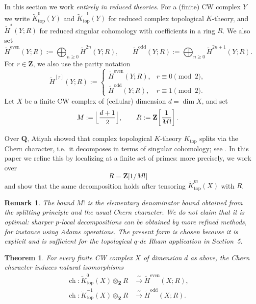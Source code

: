 \documentclass[11pt]{amsart}
\newtheorem{theorem}[lemma]{Theorem}
\newtheorem{remark}[lemma]{Remark}
\numberwithin{equation}{section}
\newcommand{\ch}{{\operatorname{ch}}}
\newcommand{\topp}{{\operatorname{top}}}
\numberwithin{equation}{section}
\newcommand{\Ktop}{K_{\operatorname{top}}}
\begin{document}
In this section we work \emph{entirely in reduced theories}. For a (finite) CW complex $Y$ we write
$\widetilde{K}_{\topp}^0(Y)$ and $\widetilde{K}_{\topp}^{-1}(Y)$ for reduced complex topological $K$-theory, and
$\widetilde H^*(Y;R)$ for reduced singular cohomology with coefficients in a ring $R$.
We also set
\[
\widetilde H^{\mathrm{even}}(Y;R):=\bigoplus_{n\ge 0}\widetilde H^{2n}(Y;R),
\qquad
\widetilde H^{\mathrm{odd}}(Y;R):=\bigoplus_{n\ge 0}\widetilde H^{2n+1}(Y;R).
\]
For $r\in\mathbf{Z}$, we also use the parity notation
\[
\widetilde H^{[r]}(Y;R):=
\begin{cases}
\widetilde H^{\mathrm{even}}(Y;R),& r\equiv 0\pmod 2,\\
\widetilde H^{\mathrm{odd}}(Y;R),& r\equiv 1\pmod 2.
\end{cases}
\]
Let $X$ be a finite CW complex of (cellular) dimension $d=\dim X$, and set
\[
M:=\Bigl\lfloor\frac{d+1}{2}\Bigr\rfloor,
\qquad
R:=\mathbf{Z}\!\left[\frac{1}{M!}\right].
\]

Over $\mathbf{Q}$, Atiyah showed that complex topological $K$-theory $\Ktop$ splits via the Chern character, i.e.\ it decomposes in terms of singular cohomology; see \cite{A62}.
In this paper we refine this by localizing at a finite set of primes: more precisely, we work over
\[
R=\mathbf{Z}\bigl[1/M!\bigr]
\]
and show that the same decomposition holds after tensoring $\widetilde{K}_{\topp}^m(X)$ with $R$.

\begin{remark}
The bound $M!$ is the elementary denominator bound obtained from the splitting
principle and the usual Chern character.  We do not claim that it is optimal:
sharper $p$-local decompositions can be obtained by more refined methods, for
instance using Adams operations.  The present form is chosen because it is
explicit and is sufficient for the topological $q$-de Rham application in
Section~5.
\end{remark}

\begin{theorem}\label{ktopchdec}
For every finite CW complex $X$ of dimension $d$ as above, the Chern character induces natural isomorphisms
\[
\begin{aligned}
\ch\colon \widetilde{K}_{\topp}^{0}(X)\otimes_{\mathbf{Z}} R &\xrightarrow{\ \sim\ } \widetilde H^{\mathrm{even}}(X;R),\\
\ch\colon \widetilde{K}_{\topp}^{-1}(X)\otimes_{\mathbf{Z}} R &\xrightarrow{\ \sim\ } \widetilde H^{\mathrm{odd}}(X;R).
\end{aligned}
\]
\end{theorem}
\end{document}
